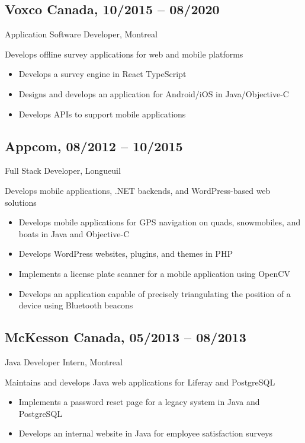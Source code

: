 \documentclass{article}
\begin{document}
\begin{paracol}{2}
\begin{rightcolumn}
    \subsection{Voxco Canada, 10/2015 -- 08/2020}
    {Application Software Developer, Montreal\par}
    {
      Develops offline survey applications for web and mobile platforms
    \par}
    \begin{itemize}
      \item Develops a survey engine in React TypeScript
      \item Designs and develops an application for Android/iOS in Java/Objective-C
      \item Develops APIs to support mobile applications
    \end{itemize}

    \vspace{1em}

    \subsection{Appcom, 08/2012 -- 10/2015}
    {Full Stack Developer, Longueuil\par}
    {
      Develops mobile applications, .NET backends, and WordPress-based web solutions
    \par}
    \begin{itemize}
      \item Develops mobile applications for GPS navigation on quads, snowmobiles, and boats in Java and Objective-C
      \item Develops WordPress websites, plugins, and themes in PHP
      \item Implements a license plate scanner for a mobile application using OpenCV
      \item Develops an application capable of precisely triangulating the position of a device using Bluetooth beacons
    \end{itemize}

    \vspace{1em}

    \subsection{McKesson Canada, 05/2013 -- 08/2013}
    {Java Developer Intern, Montreal\par}
    {
      Maintains and develops Java web applications for Liferay and PostgreSQL
    \par}
    \begin{itemize}
      \item Implements a password reset page for a legacy system in Java and PostgreSQL
      \item Develops an internal website in Java for employee satisfaction surveys
    \end{itemize}


\end{rightcolumn}
\end{paracol}
\end{document}
